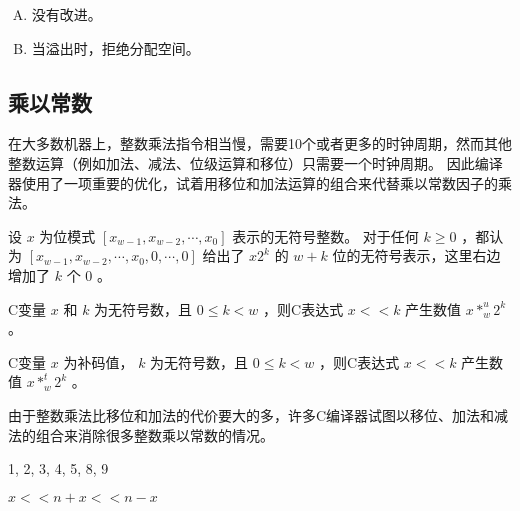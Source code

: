 {{        %
        \begin{practicec}

        \end{practicec}

        \begin{practicec}
            \begin{enumerate}[A.]
                \item 没有改进。
                \item 当溢出时，拒绝分配空间。
            \end{enumerate}
        \end{practicec}
    }

    \subsection{乘以常数}
    {
        在大多数机器上，整数乘法指令相当慢，需要10个或者更多的时钟周期，然而其他整数运算（例如加法、减法、位级运算和移位）只需要一个时钟周期。
        因此编译器使用了一项重要的优化，试着用移位和加法运算的组合来代替乘以常数因子的乘法。

        \begin{defines}[乘以2的幂]
            设 $x$ 为位模式 $[x_{w - 1}, x_{w - 2}, \cdots, x_0]$ 表示的无符号整数。
            对于任何 $k \geq 0$ ，都认为 $[x_{w - 1}, x_{w - 2}, \cdots, x_0, 0, \cdots, 0]$ 给出了 $x2^k$ 的 $w + k$ 位的无符号表示，这里右边增加了 $k$ 个 $0$ 。
        \end{defines}

        \begin{defines}[与2的幂相乘的无符号乘法]
            C变量 $x$ 和 $k$ 为无符号数，且 $0 \leq k < w$ ，则C表达式 $x << k$ 产生数值 $x *_w^u 2^k$ 。
        \end{defines}

        \begin{defines}[与2的幂相乘的补码乘法]
            C变量 $x$ 为补码值， $k$ 为无符号数，且 $0 \leq k < w$ ，则C表达式 $x << k$ 产生数值 $x *_w^t 2^k$ 。
        \end{defines}

        由于整数乘法比移位和加法的代价要大的多，许多C编译器试图以移位、加法和减法的组合来消除很多整数乘以常数的情况。

        \begin{practicec}
            1, 2, 3, 4, 5, 8, 9
        \end{practicec}

        \begin{practicec}
            $x << n + x << n - x$
        \end{practicec}

}}
